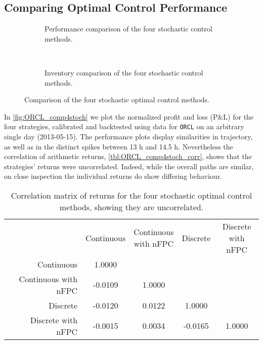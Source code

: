 \subsection{Comparing Optimal Control Performance}

\begin{figure}%
  \centering%
\begin{subfigure}[b]{0.9\linewidth}%
  \setlength{}%
  \setlength\figurewidth{\linewidth}%
  \caption{Performance comparison of the four stochastic control methods.}\label{fig:ORCL_comp4stoch}%
\end{subfigure}\\%
\vspace{1cm}%
\begin{subfigure}[b]{0.9\linewidth}%
  \centering%
  \setlength{}%
  \setlength\figurewidth{\linewidth}%
  \caption{Inventory comparison of the four stochastic control methods.}\label{fig:ORCL_comp4stoch_inv}%
\end{subfigure}%
\caption[Comparison of the four stochastic optimal control methods]{Comparison of the four stochastic optimal control methods.}%
\end{figure}
In \autoref{fig:ORCL_comp4stoch} we plot the normalized profit and loss (P\&L) for the four strategies, calibrated and backtested using data for \texttt{ORCL} on an arbitrary single day (2013-05-15). The performance plots display similarities in trajectory, as well as in the distinct spikes between 13 h and 14.5 h. Nevertheless the correlation of arithmetic returns, \autoref{tbl:ORCL_comp4stoch_corr}, shows that the strategies' returns were uncorrelated. Indeed, while the overall paths are similar, on close inspection the individual returns do show differing behaviour.
\begin{table}[H]
\centering
{}
\caption[Correlation matrix of stochastic optimal control returns]{Correlation matrix of returns for the four stochastic optimal control methods, showing they are uncorrelated.}\label{tbl:ORCL_comp4stoch_corr}
\begin{tabular}{@{} r *{4}{c} @{}}
\toprule
& Continuous & \cellbreak{t}{c}{Continuous \\ with nFPC} & Discrete & \cellbreak{t}{c}{Discrete \\ with nFPC} \\
\cmidrule{2-5}
Continuous          &  1.0000  & & & \\
Continuous with nFPC   & -0.0109  &  1.0000 &  & \\
Discrete         & -0.0120  &  0.0122 &   1.0000 &  \\
Discrete with nFPC  & -0.0015  &  0.0034 &  -0.0165 &   1.0000 \\
\bottomrule
\end{tabular}
\end{table}
